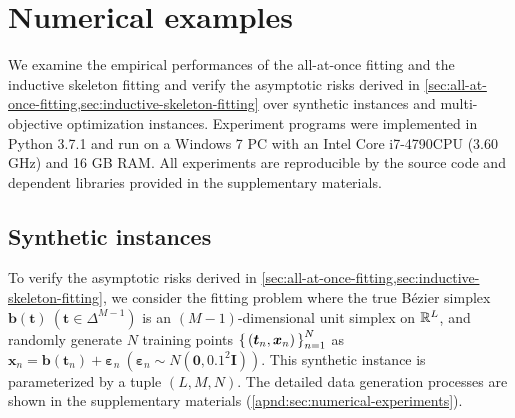 \documentclass{article}
\begin{document}


\section{Numerical examples}\label{sec:numerical-examples}
We examine the empirical performances of the all-at-once fitting and the inductive skeleton fitting and verify the asymptotic risks derived in \cref{sec:all-at-once-fitting,sec:inductive-skeleton-fitting} over synthetic instances and multi-objective optimization instances. 
Experiment programs were implemented in Python 3.7.1 and run on a Windows 7 PC with an Intel Core i7-4790CPU (3.60 GHz) and 16 GB RAM.
All experiments are reproducible by the source code and dependent libraries provided in the supplementary materials.

\subsection{Synthetic instances}\label{sec:synthetic-instances}
To verify the asymptotic risks derived in \cref{sec:all-at-once-fitting,sec:inductive-skeleton-fitting}, we consider the fitting problem where the true B\'ezier simplex $\bm b(\bm{t})~(\bm t \in \Delta^{M-1})$ is an $(M-1)$-dimensional unit simplex on $\mathbb{R}^L$, and randomly generate $N$ training points $\set{(\bm t_n, \bm x_n)}_{n = 1}^N$ as $\bm x_n = \bm b(\bm t_n) + \bm{\varepsilon}_n~(\bm \varepsilon_n \sim N(\bm 0, 0.1^2 \bm I))$.
This synthetic instance is parameterized by a tuple $(L, M, N)$. 
The detailed data generation processes are shown in the supplementary materials (\cref{apnd:sec:numerical-experiments}).
\end{document}
